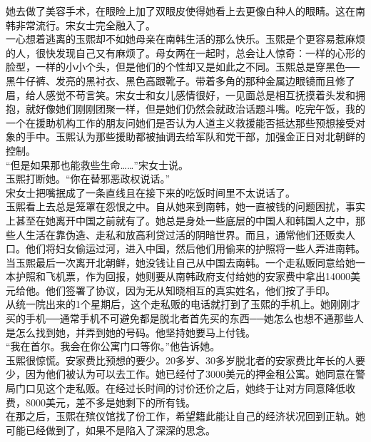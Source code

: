 她去做了美容手术，在眼睑上加了双眼皮使得她看上去更像白种人的眼睛。这在南韩非常流行。宋女士完全融入了。\\

一心想着逃离的玉熙却不如她母亲在南韩生活的那么快乐。玉熙是个更容易惹麻烦的人，很快发现自己又有麻烦了。母女两在一起时，总会让人惊奇：一样的心形的脸型，一样的小小个头，但是他们的个性却又是如此之不同。玉熙总是穿黑色──黑牛仔裤、发亮的黑衬衣、黑色高跟靴子。带着多角的那种金属边眼镜而且修了眉，给人感觉不苟言笑。宋女士和女儿感情很好，一见面总是相互抚摸着头发和拥抱，就好像她们刚刚团聚一样，但是她们仍然会就政治话题斗嘴。吃完午饭，我的一个在援助机构工作的朋友问她们是否认为人道主义救援能否抵达那些预想接受对象的手中。玉熙认为那些援助都被抽调去给军队和党干部，加强金正日对北朝鲜的控制。\\

“但是如果那也能救些生命……”宋女士说。\\

玉熙打断她。“你在替邪恶政权说话。”\\

宋女士把嘴抿成了一条直线且在接下来的吃饭时间里不太说话了。\\

玉熙看上去总是笼罩在怨恨之中。自从她来到南韩，她一直被钱的问题困扰，事实上甚至在她离开中国之前就有了。她总是身处一些底层的中国人和韩国人之中，那些人生活在靠伪造、走私和放高利贷过活的阴暗世界。而且，通常他们还贩卖人口。他们将妇女偷运过河，进入中国，然后他们用偷来的护照将一些人弄进南韩。当玉熙最后一次离开北朝鲜，她没钱让自己从中国去南韩。一个走私贩同意给她一本护照和飞机票，作为回报，她则要从南韩政府支付给她的安家费中拿出14000美元给他。他们签署了协议，因为无从知晓相互的真实姓名，他们按了手印。\\

从统一院出来的1个星期后，这个走私贩的电话就打到了玉熙的手机上。她刚刚才买的手机──通常手机不可避免都是脱北者首先买的东西──她怎么也想不通那些人是怎么找到她，并弄到她的号码。他坚持她要马上付钱。\\

“我在首尔。我会在你公寓门口等你。”他告诉她。\\

玉熙很惊慌。安家费比预想的要少。20多岁、30多岁脱北者的安家费比年长的人要少，因为他们被认为可以去工作。她已经付了3000美元的押金租公寓。她同意在警局门口见这个走私贩。在经过长时间的讨价还价之后，她终于让对方同意降低收费，8000美元，差不多是她剩下的所有钱。\\

在那之后，玉熙在殡仪馆找了份工作，希望籍此能让自己的经济状况回到正轨。她可能已经做到了，如果不是陷入了深深的思念。\\

